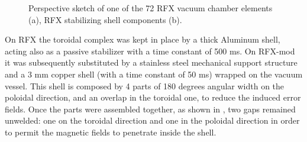 \begin{figure}[ht!]
\centering
{}
\caption{ Perspective sketch of one of the 72 RFX vacuum chamber elements (a), RFX stabilizing shell components (b). }
\end{figure}

On RFX the toroidal complex was kept in place by a thick Aluminum shell, acting also as a passive stabilizer with a time constant of 500 ms. On RFX-mod it was subsequently substituted by a stainless steel mechanical support structure and a 3 mm copper shell (with a time constant of 50 ms) wrapped on the vacuum vessel. This shell is composed by 4 parts of 180 degrees angular width on the poloidal direction, and an overlap in the toroidal one, to reduce the induced error fields. Once the parts were assembled together, as shown in \Figure{\ref{fig:rfx_shell}}, two gaps remained unwelded: one on the toroidal direction and one in the poloidal direction in order to permit the magnetic fields to penetrate inside the shell.

